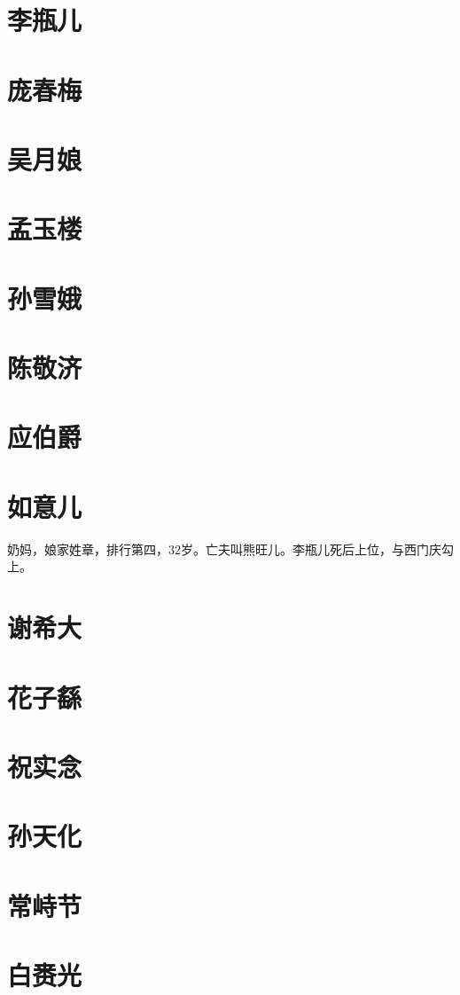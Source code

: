 \section{李瓶儿}

\section{庞春梅}

\section{吴月娘}

\section{孟玉楼}

\section{孙雪娥}

\section{陈敬济}

\section{应伯爵}

\section{如意儿}
奶妈，娘家姓章，排行第四，32岁。亡夫叫熊旺儿。李瓶儿死后上位，与西门庆勾上。

\section{谢希大}

\section{花子繇}

\section{祝实念}

\section{孙天化}

\section{常峙节}

\section{白赉光}